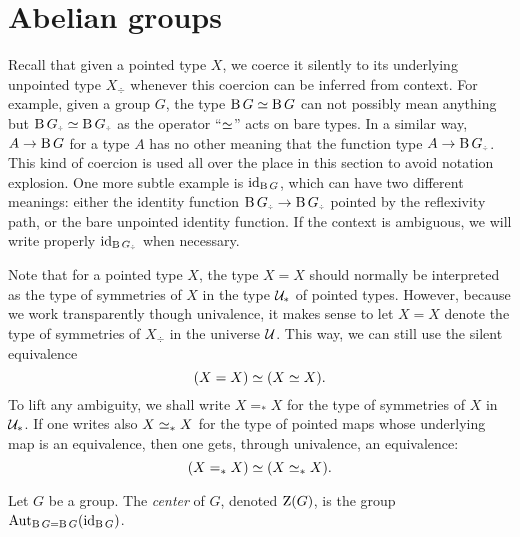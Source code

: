 \section{Abelian groups}
\label{sec:abelian-groups}

Recall that given a pointed type $X$, we coerce it silently to its
underlying unpointed type $X_\div$ whenever this coercion can be
inferred from context. For example, given a group $G$, the type
${\operatorname{B} G}\simeq {\operatorname{B}G}$ can not possibly mean anything but ${\clf G}_\div\simeq {\clf G}_\div$
as the operator ``$\simeq$'' acts on bare types. In a similar way,
$A\to {\operatorname{B}G}$ for a type $A$ has no other meaning that the function type
$A \to {\clf G}_\div$. This kind of coercion is used all over the place in
this section to avoid notation explosion. One more subtle example is
$\mathord{\mathrm{id}}_{\operatorname{B} G}$, which can have two different meanings: either the identity
function ${\clf G}_\div \to {\clf G}_\div$ pointed by the reflexivity path, or the
bare unpointed identity function. If the context is ambiguous, we will
write properly $\id_{{\clf G}_\div}$ when necessary.

Note that for a pointed type $X$, the type $X=X$ should normally be
interpreted as the type of symmetries of $X$ in the type ${\mathcal{U}}_\ast$
of pointed types. However, because we work transparently though
univalence, it makes sense to let $X=X$ denote the type of
symmetries of $X_\div$ in the universe ${\mathcal{U}}$. This way, we can still
use the silent equivalence
\begin{displaymath}
  (X=X) \simeq (X\simeq X).
\end{displaymath}
To lift any ambiguity, we shall write $X=_\ast X$ for the type of
symmetries of $X$ in ${\mathcal{U}}_\ast$. If one writes also $X\simeq_\ast X$ for
the type of pointed maps whose underlying map is an equivalence, then
one gets, through univalence, an equivalence:
\begin{displaymath}
  (X=_\ast X) \simeq (X\simeq_\ast X).
\end{displaymath}

\begin{definition}
  Let $G$ be a group. The {\em center} of $G$, denoted
  $\operatorname{Z}(G)$, is the group
  $\operatorname{Aut}_{{\operatorname{B} G}={\operatorname{B} G}}(\mathord{\mathrm{id}}_{\operatorname{B} G})$.
\end{definition}

